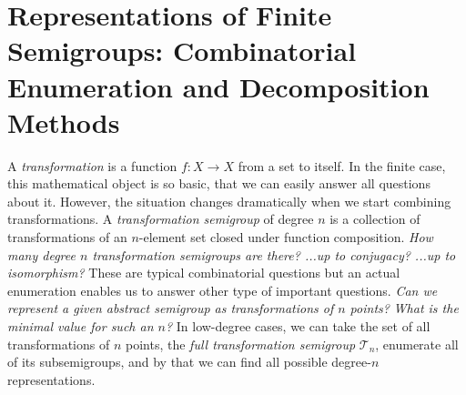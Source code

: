\documentclass{amsart}
\newcommand{\FullTrans}{\mathcal T}
\begin{document}
\section*{Representations of Finite Semigroups: Combinatorial Enumeration and Decomposition Methods}

A \emph{transformation} is a function $f:X\rightarrow X$ from a set to itself.
In the finite case, this mathematical object is so basic, that we can easily answer all questions about it.
However, the situation changes dramatically when we start combining transformations.
A \emph{transformation semigroup} of degree $n$ is a collection of transformations of an $n$-element set closed under function composition.
\emph{How many degree $n$ transformation semigroups are there? ...up to conjugacy? ...up to isomorphism?}
These are typical combinatorial questions but an actual enumeration enables us to answer other type of important questions.
\emph{Can we represent a given abstract semigroup as transformations of $n$ points?}
\emph{What is the minimal value for such an $n$?}
In low-degree cases,  we can take the set of all transformations of $n$ points, the \emph{full transformation semigroup} $\FullTrans_n$, enumerate all of its subsemigroups, and by that we can find all possible degree-$n$ representations. 
\end{document}
